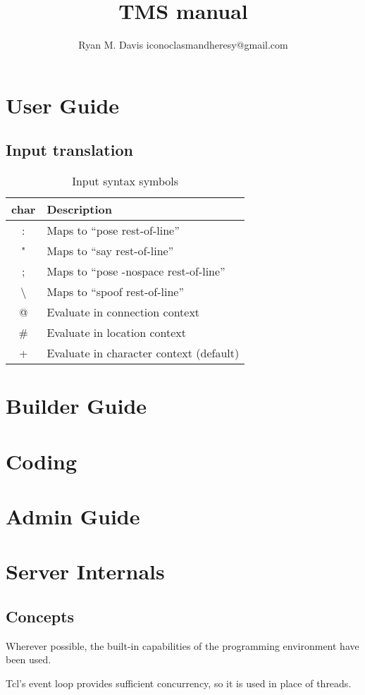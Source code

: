 \documentclass[10pt,letterpaper,twoside]{book}
\author{Ryan M. Davis iconoclasmandheresy@gmail.com}
\title{TMS manual}
\begin{document}
\pagestyle{empty}
\maketitle
\frontmatter
\pagestyle{headings}
\tableofcontents
\listoftables
\mainmatter
\part{User Guide}
\chapter{Input translation}
\begin{table}
\begin{tabular}{c p{}}
char & Description\\
\hline
: & Maps to ``pose rest-of-line''\\
" & Maps to ``say rest-of-line''\\
; & Maps to ``pose -nospace rest-of-line''\\
\textbackslash & Maps to ``spoof rest-of-line''\\
@ & Evaluate in connection context\\
\# & Evaluate in location context\\
+ & Evaluate in character context (default)\\
\hline
\end{tabular}
\caption{Input syntax symbols}
\label{tab:inputsyntaxchars}
\end{table}
\part{Builder Guide}
\part{Coding}
\part{Admin Guide}
\part{Server Internals}
\chapter{Concepts}
Wherever possible, the built-in capabilities of the programming environment have been used.

Tcl's event loop provides sufficient concurrency, so it is used in place of threads.
\end{document}
